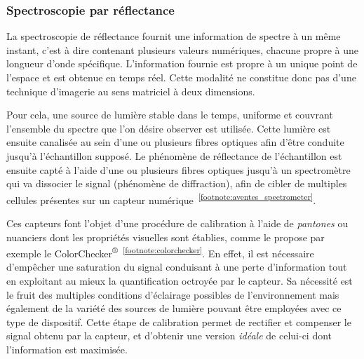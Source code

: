 \subsubsection{Spectroscopie par réflectance}
La spectroscopie de réflectance fournit une information de spectre à un même instant, c'est à dire contenant plusieurs valeurs numériques, chacune propre à une longueur d'onde spécifique. L'information fournie est propre à un unique point de l'espace et est obtenue en temps réel. Cette modalité ne constitue donc pas d'une technique d'imagerie au sens matriciel à deux dimensions.\par

Pour cela, une source de lumière stable dans le temps, uniforme et couvrant l'ensemble du spectre que l'on désire observer est utilisée. Cette lumière est ensuite canalisée au sein d'une ou plusieurs fibres optiques afin d'être conduite jusqu'à l'échantillon supposé. Le phénomène de réflectance de l'échantillon est ensuite capté à l'aide d'une ou plusieurs fibres optiques jusqu'à un spectromètre qui va dissocier le signal (phénomène de diffraction), afin de cibler de multiples cellules présentes sur un capteur numérique~\cite{Murphy2005,Malla2008}\textsuperscript{\ref{footnote:aventes_spectrometer}}.\par

Ces capteurs font l'objet d'une procédure de calibration à l'aide de \textit{pantones} ou nuanciers dont les propriétés visuelles sont établies, comme le propose par exemple le ColorChecker\textsuperscript{®}~\textsuperscript{\ref{footnote:colorchecker}}. En effet, il est nécessaire d'empêcher une saturation du signal conduisant à une perte d'information tout en exploitant au mieux la quantification octroyée par le capteur. Sa nécessité est le fruit des multiples conditions d'éclairage possibles de l'environnement mais également de la variété des sources de lumière pouvant être employées avec ce type de dispositif. Cette étape de calibration permet de rectifier et compenser le signal obtenu par la capteur, et d'obtenir une version \textit{idéale} de celui-ci dont l'information est maximisée.\par

